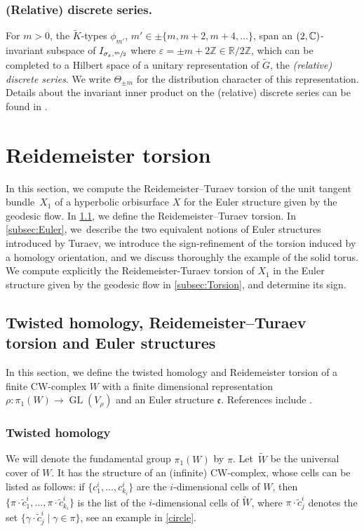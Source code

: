 \documentclass[10pt]{amsart}
\theoremstyle{plain}
\theoremstyle{definition}
\theoremstyle{remark}
\newcommand{\R}{\mathbb{R}}
\newcommand{\Z}{\mathbb{Z}}
\newcommand{\C}{\mathbb{C}}
\let\sl\relax
\DeclareMathOperator{\sl}{\mathfrak{sl}}
\DeclareMathOperator{\GL}{GL}
\numberwithin{equation}{section}
\let\Subsection\subsection\let\Subsubsection\subsubsection
\begin{document}
\subsubsection*{(Relative) discrete series.} For $m>0$, the $\widetilde{K}$-types $\phi_{m'}$, $m'\in\pm\{m,m+2,m+4,\ldots\}$, span an $\sl(2,\C)$-invariant subspace of $I_{\sigma_\varepsilon,\sfrac{m}{2}}$ where $\varepsilon=\pm m+2\Z\in\R/2\Z$, which can be completed to a Hilbert space of a unitary representation of $\widetilde{G}$, the \emph{(relative) discrete series}. We write $\Theta_{\pm m}$ for the distribution character of this representation. Details about the invariant inner product on the (relative) discrete series can be found in \cite[\S 1]{Hof94}.

\section{Reidemeister torsion}
\label{sec:Reidemeister}
In this section, we compute the Reidemeister--Turaev torsion of the unit tangent bundle~$X_1$ of a hyperbolic orbisurface $X$ for the Euler structure given by the geodesic flow. In \cref{subsec:Defi}, we define the Reidemeister--Turaev torsion. In \cref{subsec:Euler}, we~describe the two equivalent notions of Euler structures introduced by Turaev, we introduce the sign-refinement of the torsion induced by a homology orientation, and we discuss thoroughly the example of the solid torus. We compute explicitly the Reidemeister-Turaev torsion of $X_1$ in the Euler structure given by the geodesic flow in \cref{subsec:Torsion}, and determine its sign.

\Subsection{Twisted homology, Reidemeister--Turaev torsion and Euler structures}
\label{subsec:Defi}
In this section, we define the twisted homology and Reidemeister torsion of a finite CW-complex $W$ with a finite dimensional representation $\rho \colon \pi_1(W) \to \GL(V_\rho)$ and an Euler structure $\mathfrak e$. References include \cite{Nicolaescu,Turaev,Turaev_book}.

\subsubsection{Twisted homology}

We will denote the fundamental group $\pi_1(W)$ by $\pi$. Let~$\widetilde W$ be the universal cover of $W$. It has the structure of an (infinite) CW-complex, whose cells can be listed as follows:
if $\{c^i_1, \ldots, c^i_{k_i}\}$ are the $i$-dimensional cells of $W$, then $\{\pi\cdot \widetilde c^i_1, \ldots,\pi \cdot \widetilde c^i_{k_i}\}$ is the list of the $i$-dimensional cells of $\widetilde W$, where $\pi \cdot \widetilde c^i_j$ denotes the set $\{\gamma \cdot \widetilde c^i_j \mid \gamma \in \pi\}$, see an example in \cref{circle}.
\end{document}
